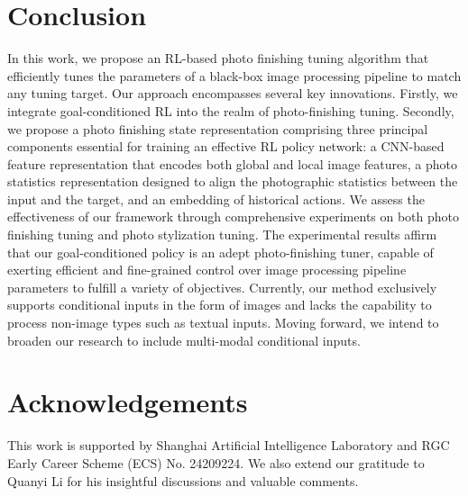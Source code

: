 \documentclass{article}
\newcommand{\pipeline}{image processing pipeline\xspace}
\newcommand{\taskPFT}{photo finishing tuning\xspace}
\newcommand{\taskPST}{photo stylization tuning\xspace}
\begin{document}
\section{Conclusion}
\label{sec:conclusion}
\vspace{-4pt}
In this work, we propose an RL-based photo finishing tuning algorithm that efficiently tunes the parameters of a black-box \pipeline to match any tuning target. Our approach encompasses several key innovations. Firstly, we integrate goal-conditioned RL into the realm of photo-finishing tuning. Secondly, we propose a photo finishing state representation comprising three principal components essential for training an effective RL policy network: a CNN-based feature representation that encodes both global and local image features, a photo statistics representation designed to align the photographic statistics between the input and the target, and an embedding of historical actions. We assess the effectiveness of our framework through comprehensive experiments on both \taskPFT and \taskPST. The experimental results affirm that our goal-conditioned policy is an adept photo-finishing tuner, capable of exerting efficient and fine-grained control over image processing pipeline parameters to fulfill a variety of objectives.
Currently, our method exclusively supports conditional inputs in the form of images and lacks the capability to process non-image types such as textual inputs. Moving forward, we intend to broaden our research to include multi-modal conditional inputs.


\clearpage

\section*{Acknowledgements}
This work is supported by Shanghai Artificial Intelligence Laboratory and RGC Early Career Scheme (ECS) No. 24209224. We also extend our gratitude to Quanyi Li for his insightful discussions and valuable comments.



\end{document}
